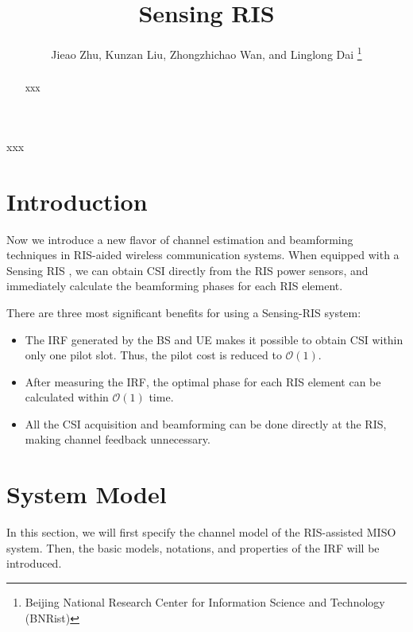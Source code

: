 \documentclass[12pt,draftclsnofoot,journal,onecolumn]{IEEEtran}
\theoremstyle{nonumberplain}
\begin{document}
\title{Sensing RIS}
\author{{Jieao Zhu, Kunzan Liu, Zhongzhichao Wan, and Linglong Dai
\vspace*{-1em}}
\thanks{Beijing National Research Center for Information Science and Technology (BNRist)}
}

\maketitle

\begin{abstract}
xxx
\end{abstract}

\begin{IEEEkeywords}
xxx
\end{IEEEkeywords}
\section{Introduction}
    Now we introduce a new flavor of channel estimation and beamforming techniques in \ac{RIS}-aided wireless communication systems. When equipped with a Sensing \ac{RIS} \cite{ma2020smartsensing}, we can obtain CSI directly from the \ac{RIS} power sensors, and immediately calculate the beamforming phases for each \ac{RIS} element.

    There are three most significant benefits for using a Sensing-RIS system:
    \begin{itemize}
        \item The \ac{IRF} generated by the BS and UE makes it possible to obtain CSI within only one pilot slot. Thus, the pilot cost is reduced to $\mathcal{O}(1)$.
        \item After measuring the \ac{IRF}, the optimal phase for each \ac{RIS} element can be calculated within $\mathcal{O}(1)$ time.
        \item All the CSI acquisition and beamforming can be done directly at the \ac{RIS}, making channel feedback unnecessary.
    \end{itemize}

\section{System Model}  \label{System Model}
    In this section, we will first specify the channel model of the RIS-assisted MISO system. Then, the basic models, notations, and properties of the \ac{IRF} will be introduced.
\end{document}
